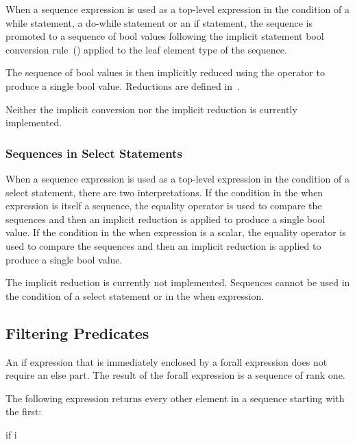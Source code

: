 When a sequence expression is used as a top-level expression in the
condition of a while statement, a do-while statement or an if
statement, the sequence is promoted to a sequence of bool values
following the implicit statement bool conversion
rule~() applied to the leaf
element type of the sequence.

The sequence of bool values is then implicitly reduced using
the \chpl{&&} operator to produce a single bool value.  Reductions are
defined in~.

\begin{status}
Neither the implicit conversion nor the implicit reduction is
currently implemented.
\end{status}

\subsubsection{Sequences in Select Statements}
\label{Sequences_in_Select_Statements}

When a sequence expression is used as a top-level expression in the
condition of a select statement, there are two interpretations.  If
the condition in the when expression is itself a sequence, the
equality operator is used to compare the sequences and then an
implicit \chpl{&&} reduction is applied to produce a single bool
value.  If the condition in the when expression is a scalar, the
equality operator is used to compare the sequences and then an
implicit \chpl{||} reduction is applied to produce a single bool
value.

\begin{status}
The implicit reduction is currently not implemented.  Sequences cannot
be used in the condition of a select statement or in the when
expression.
\end{status}

\subsection{Filtering Predicates}
\label{Filtering_Predicates}

An if expression that is immediately enclosed by a forall expression
does not require an else part.  The result of the forall expression is
a sequence of rank one.
\begin{example}
The following expression returns every other element in a sequence
starting with the first:
\begin{chapel}
[i in 1..s.length] if i %
\end{chapel}
\end{example}

